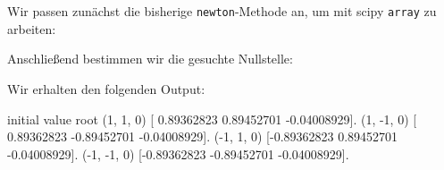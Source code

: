 \section{}

Wir passen zunächst die bisherige \texttt{newton}-Methode an, um mit scipy \texttt{array} zu arbeiten:



Anschließend bestimmen wir die gesuchte Nullstelle:



Wir erhalten den folgenden Output:

\begin{consoleoutput}
initial value   root
(1, 1, 0)       [ 0.89362823  0.89452701 -0.04008929].
(1, -1, 0)      [ 0.89362823 -0.89452701 -0.04008929].
(-1, 1, 0)      [-0.89362823  0.89452701 -0.04008929].
(-1, -1, 0)     [-0.89362823 -0.89452701 -0.04008929].
\end{consoleoutput}
